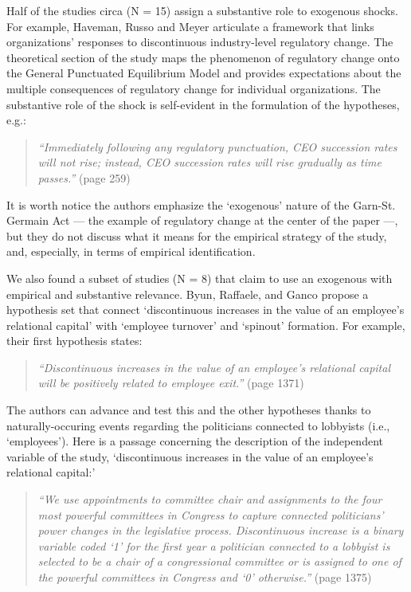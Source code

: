 \begin{refsection}
Half of the studies circa (N = 15) assign a substantive role to exogenous
shocks.  For example, Haveman, Russo and Meyer \autocite*{haveman2001253} 
articulate a framework that links organizations' responses to discontinuous
industry-level regulatory change. The theoretical section of the study maps the
phenomenon of regulatory change onto the General Punctuated Equilibrium Model
and provides expectations about the multiple consequences of regulatory change
for individual organizations. The substantive role of the shock is self-evident
in the formulation of the hypotheses, e.g.:

\begin{quote}
  \textit{
    ``Immediately following any regulatory punctuation, CEO succession rates
    will not rise; instead, CEO succession rates will rise gradually as time
    passes.''
  }
  (page 259)
\end{quote}

It is worth notice the authors emphasize the `exogenous' nature of the Garn-St.
Germain Act --- the example of regulatory change at the center of the paper 
---, but they do not discuss what it means for the empirical strategy of 
the study, and, especially, in terms of empirical identification.

We also found a subset of studies (N = 8) that claim to use an exogenous with
empirical and substantive relevance. Byun, Raffaele, and Ganco
\autocite{byun20191368} propose a hypothesis set that connect `discontinuous
increases in the value of an employee's relational capital' with `employee
turnover' and `spinout' formation. For example, their first hypothesis states:

\begin{quote}
  \textit{
    ``Discontinuous increases in the value of an  employee's relational capital 
    will be positively related to employee exit.''
  }
  (page 1371)
\end{quote}

The authors can advance and test this and the other hypotheses thanks to
naturally-occuring events regarding the politicians connected to lobbyists
(i.e., `employees').  Here is a passage concerning the description of the
independent variable of the study, `discontinuous increases in the value of an
employee's relational capital:'

\begin{quote}
  \textit{
    ``We use appointments to committee chair and assignments to the four most
    powerful committees in Congress to capture connected politicians' power
    changes in the legislative process. Discontinuous increase is a binary
    variable coded `1' for the first year a politician connected to a lobbyist is
    selected to be a chair of a congressional committee or is assigned to one of
    the powerful committees in Congress and `0' otherwise.''
  }
  (page 1375)
\end{quote}


\end{refsection}
